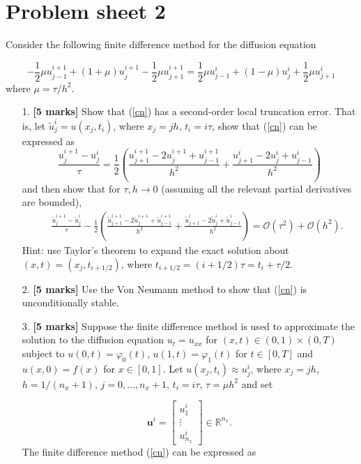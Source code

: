 \documentclass[12pt,a4paper]{article}
\begin{document}
\section{Problem sheet 2}
Consider the following finite difference method for the diffusion equation

\begin{equation}
-\frac{1}{2}\mu u^{i+1}_{j-1} + (1 + \mu)u^{i+1}_j -\frac{1}{2}\mu u^{i+1}_{j+1} = 
\frac{1}{2}\mu u^{i}_{j-1} + (1 - \mu)u^{i}_j +\frac{1}{2}\mu u^{i}_{j+1}   \label{cn}
\end{equation}
where $\mu = \tau/h^2$.

\begin{itemize}
\item[1. ] \textbf{[5 marks]} Show that (\ref{cn}) has a second-order local truncation error. That is, let $\tilde{u}^i_j = u(x_j,t_i)$, where $x_j = jh$, $t_i = i\tau$, show that (\ref{cn}) can be expressed as
\[
\frac{u^{i+1}_j - u^i_j}{\tau} = \frac{1}{2}\left( \frac{u^{i+1}_{j+1} - 2u^{i+1}_{j} + u^{i+1}_{j-1}}{h^2} + \frac{u^{i}_{j+1} - 2u^{i}_{j} + u^{i}_{j-1}}{h^2}   \right)
\]
and then show that for $\tau, h \to 0$ (assuming all the relevant partial derivatives are bounded),
\begin{eqnarray*}
&& \frac{\tilde{u}^{i+1}_j - \tilde{u}^i_j}{\tau} - \frac{1}{2}\left( \frac{\tilde{u}^{i+1}_{j+1} - 2\tilde{u}^{i+1}_{j} + \tilde{u}^{i+1}_{j-1}}{h^2} + \frac{\tilde{u}^{i}_{j+1} - 2\tilde{u}^{i}_{j} + \tilde{u}^{i}_{j-1}}{h^2}   \right) = \mathcal{O}(\tau^2) + \mathcal{O}(h^2).
\end{eqnarray*}
Hint: use Taylor's theorem to expand the exact solution about $(x,t) = (x_j,t_{i+1/2})$, where $t_{i+1/2} = (i + 1/2)\tau = t_i + \tau/2$.

\item[2. ] \textbf{[5 marks]} Use the Von Neumann method to show that (\ref{cn}) is unconditionally stable.


\item[3. ] \textbf{[5 marks]} Suppose the finite difference method is used to approximate the solution to the diffusion equation $u_t = u_{xx}$ for $(x, t) \in (0,1) \times (0,T)$ subject to $u(0,t) = \varphi_0(t)$, $u(1,t) = \varphi_1(t)$ for $t \in [0, T]$ and $u(x,0) = f(x)$ for $x \in [0, 1]$.  Let $u(x_j,t_i) \approx u^i_j$, where $x_j = jh$, $h = 1/(n_x + 1)$, $j = 0, \ldots, n_x+1$, $t_i = i\tau$, $\tau = \mu h^2$ and set


\[
\mathbf{u}^i = \begin{bmatrix}
u^{i}_{1} \\
\vdots \\
u^{i}_{n_x}
\end{bmatrix} \in \mathbb{R}^{n_x}.
\]
The finite difference method (\ref{cn}) can be expressed as


\end{itemize}
\end{document}
